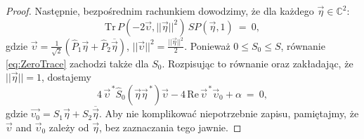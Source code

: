 {\begin{proof}
Następnie, bezpośrednim rachunkiem dowodzimy, że dla każdego
$\vec{\eta} \in \mathbb{C}^{2}$:
\begin{equation}
 \label{eq:ZeroTrace}
 \text{Tr} \, P(-2\vec{\upsilon}, ||\vec{\eta}||^{2}) \, S P(\vec{\eta},1)
     \:=\: 0,
\end{equation}
gdzie $\vec{\upsilon} =
 \frac{1}{\sqrt{2}} \left(
  \hat{P}_{1} \vec{\eta} + \hat{P}_{2} \overline{\vec{\eta}}
 \right)$,
$||\vec{\upsilon}||^{2} = \tfrac{||\vec{\eta}||^{2}}{2}$.
Ponieważ $0 \leq S_{0} \leq S$, równanie
\eqref{eq:ZeroTrace} zachodzi także dla $S_{0}$.
Rozpisując to równanie oraz zakładając, że $||\vec{\eta}|| = 1$,
dostajemy
\begin{equation}
 \label{eq:ZeroTraceExplicit}
 4 \, \vec{\upsilon}^{\,*} \hat{S}_{0}(\vec{\eta} \vec{\eta}^{\,*}) \vec{\upsilon} -
 4 \, \text{Re} \, \vec{\upsilon}^{\,*} \vec{\upsilon}_{0} + \alpha \: = \: 0,
\end{equation}
gdzie $\vec{\upsilon_{0}} = S_{1} \vec{\eta} + S_{2} \overline{\vec{\eta}}$.
Aby nie komplikować niepotrzebnie zapisu,
pamiętajmy, że $\vec{\upsilon}$ and $\vec{\upsilon}_{0}$ zależy od $\vec{\eta}$,
bez zaznaczania tego jawnie.


\end{proof}}
